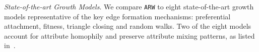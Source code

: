 \textit{State-of-the-art Growth Models}. We compare \texttt{ARW} to eight state-of-the-art
growth models representative of the key edge formation
mechanisms: preferential attachment, fitness, triangle closing and random walks.
Two of the eight models account for attribute homophily and preserve attribute mixing patterns,
as listed in~.
%
%
%
%
%
%
%
%
%

